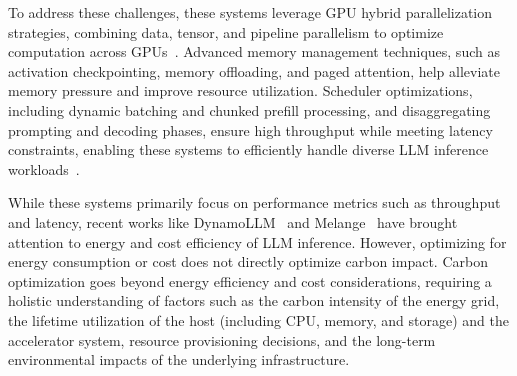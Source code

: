 To address these challenges, these systems leverage GPU hybrid parallelization strategies, combining data, tensor, and pipeline parallelism to optimize computation across GPUs~\cite{mei2024helix,li2022amp}. Advanced memory management techniques, such as activation checkpointing, memory offloading, and paged attention, help alleviate memory pressure and improve resource utilization. Scheduler optimizations, including dynamic batching and chunked prefill processing, and disaggregating prompting and decoding phases, ensure high throughput while meeting latency constraints, enabling these systems to efficiently handle diverse LLM inference workloads~\cite{patel2023splitwise,zhong2024distserve}.




While these systems primarily focus on performance metrics such as throughput and latency, recent works like DynamoLLM~\cite{stojkovic2024dynamollm} and Melange~\cite{griggs2024mlange} have brought attention to energy and cost efficiency of LLM inference. However, optimizing for energy consumption or cost does not  directly optimize carbon impact. Carbon optimization goes beyond energy efficiency and cost considerations, requiring a holistic understanding of factors such as the carbon intensity of the energy grid, the lifetime utilization of the host (including CPU, memory, and storage) and the accelerator system, resource provisioning decisions, and the long-term environmental impacts of the underlying infrastructure.
